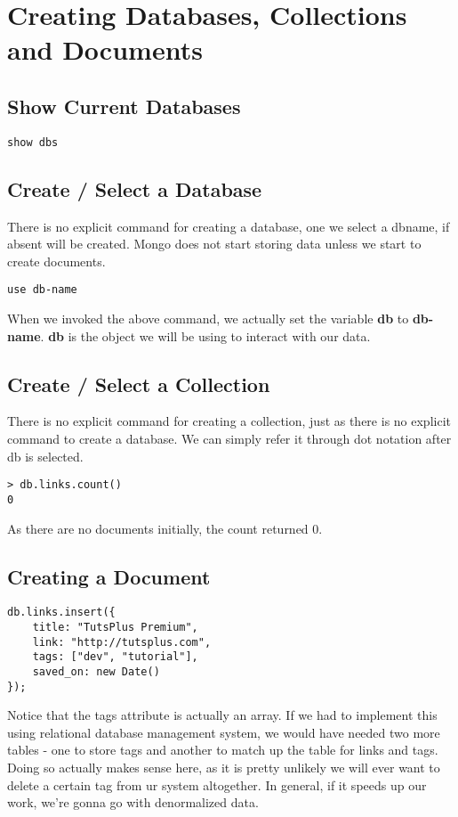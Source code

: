 \documentclass[a4paper, 12pt]{article}
\begin{document}
\section{Creating Databases, Collections and Documents}
\subsection{Show Current Databases}
\begin{verbatim}
show dbs
\end{verbatim}
\subsection{Create / Select a Database}
There is no explicit command for creating a database, one we select a dbname, if absent will be created. Mongo does not start storing data unless we start to create documents.
\begin{verbatim}
use db-name
\end{verbatim}
When we invoked the above command, we actually set the variable \textbf{db} to \textbf{db-name}. \textbf{db} is the object we will be using to interact with our data.
\subsection{Create / Select a Collection}
There is no explicit command for creating a collection, just as there is no explicit command to create a database. We can simply refer it through dot notation after db is selected.
\begin{verbatim}
> db.links.count()
0
\end{verbatim}
As there are no documents initially, the count returned 0.
\subsection{Creating a Document}
\begin{verbatim}
db.links.insert({
    title: "TutsPlus Premium",
    link: "http://tutsplus.com",
    tags: ["dev", "tutorial"],
    saved_on: new Date()
});
\end{verbatim}
Notice that the tags attribute is actually an array. If we had to implement this using relational database management system, we would have needed two more tables - one to store tags and another to match up the table for links and tags. Doing so actually makes sense here, as it is pretty unlikely we will ever want to delete a certain tag from ur system altogether. In general, if it speeds up our work, we're gonna go with denormalized data.
\end{document}
